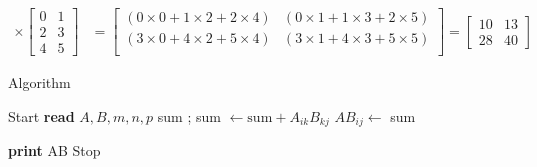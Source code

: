 \documentclass[11pt]{ipu-c}
\begin{document}
{\begin{align*}
            \times
            \begin{bmatrix}
                0 & 1 \\
                2 & 3 \\
                4 & 5
            \end{bmatrix}
            &=
            \begin{bmatrix}
                \left( 0\times{0} + 1\times{2} + 2\times{4} \right)
                & \left( 0\times{1} + 1\times{3} + 2\times{5} \right) \\
                \left( 3\times{0} + 4\times{2} + 5\times{4} \right)
                & \left( 3\times{1} + 4\times{3} + 5\times{5} \right) \\
            \end{bmatrix}
            =
            \begin{bmatrix}
                10 & 13 \\
                28 & 40
            \end{bmatrix}
        \end{align*}
    }

    \begin{tabularsection}{Algorithm}
        \begin{algorithmic}[1]
            \State Start
            \State \textbf{read} $A, B, m, n, p$
                    \State sum ;
                        \State sum $\gets \text{sum} + A_{ik} B_{kj}$
                    \EndFor
                    \State $AB_{ij} \gets$ sum
                \EndFor
            \EndFor

            \State \textbf{print} AB
            \State Stop
        \end{algorithmic}
    \end{tabularsection}

\end{document}
